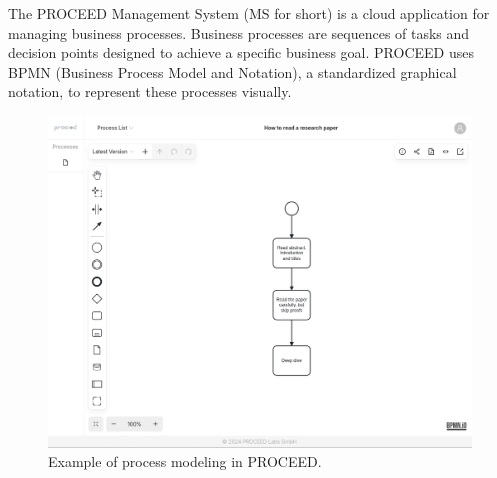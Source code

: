 The PROCEED Management System (MS for short) is a cloud application for managing business
processes.
Business processes are sequences of tasks and decision points designed to achieve a specific
business goal.
PROCEED uses BPMN (Business Process Model and Notation), a standardized
graphical notation, to represent these processes visually.



\begin{figure}[h]
	\centering
	\includegraphics[scale=0.4]{images/proceed-ms-modeling.png}
	\caption{Example of process modeling in PROCEED.}
\end{figure}
\FloatBarrier

